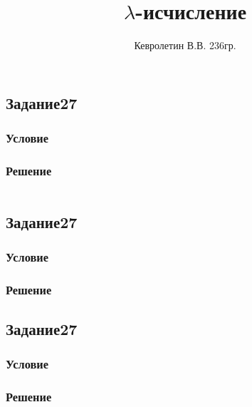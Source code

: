 \documentclass[10pt,a4paper]{article}
\author{Кевролетин В.В. 236гр.}
\title{$\lambda$-исчисление}
\begin{document}
\maketitle

\subsection*{Задание27}
\subsubsection*{Условие}
\subsubsection*{Решение}
\begin{lstlisting}
\end{lstlisting}


\subsection*{Задание27}
\subsubsection*{Условие}
\subsubsection*{Решение}

\subsection*{Задание27}
\subsubsection*{Условие}
\subsubsection*{Решение}
\end{document}
